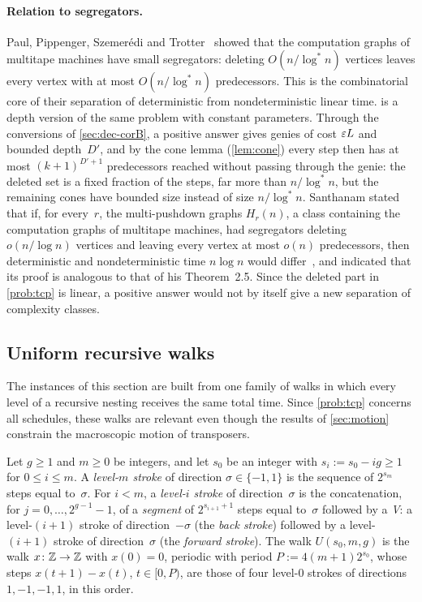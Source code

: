 \paragraph{Relation to segregators.} Paul, Pippenger, Szemer\'edi and Trotter~\cite{PPST1983} showed that the
computation graphs of multitape machines have small segregators: deleting $O(n/\log^*n)$ vertices leaves every vertex
with at most $O(n/\log^*n)$ predecessors. This is the combinatorial core of their separation of deterministic from
nondeterministic linear time.  is a depth version of the same problem with constant parameters.
Through the conversions of \cref{sec:dec-corB}, a positive answer gives genies of cost $\varepsilon L$ and bounded
depth~$D'$, and by the cone lemma (\cref{lem:cone}) every step then has at most $(k+1)^{D'+1}$ predecessors reached
without passing through the genie: the deleted set is a fixed fraction of the steps, far more than $n/\log^*n$, but
the remaining cones have bounded size instead of size $n/\log^*n$. Santhanam stated that if, for every~$r$, the
multi-pushdown graphs $H_r(n)$, a class containing the computation graphs of multitape machines, had segregators
deleting $o(n/\log n)$ vertices and leaving every vertex at most $o(n)$ predecessors, then deterministic and
nondeterministic time $n\log n$ would differ~\cite[Thm.~2.7]{Santhanam2001}, and indicated that its proof is analogous
to that of his Theorem~2.5. Since the deleted
part in \cref{prob:tcp} is linear, a positive answer would not by itself give a new separation of complexity classes.

\subsection{Uniform recursive walks}\label{sec:dep-walks}

The instances of this section are built from one family of walks in which every level of a recursive nesting
receives the same total time. Since \cref{prob:tcp} concerns all schedules, these walks are relevant even though the
results of \cref{sec:motion} constrain the macroscopic motion of transposers.

\begin{definition}\label{def:dep-walk}
Let $g\ge1$ and $m\ge0$ be integers, and let $s_0$ be an integer with $s_i:=s_0-ig\ge1$ for $0\le i\le m$. A
\emph{level-$m$ stroke} of direction $\sigma\in\{-1,1\}$ is the sequence of $2^{s_m}$ steps equal to~$\sigma$. For
$i<m$, a \emph{level-$i$ stroke} of direction~$\sigma$ is the concatenation, for $j=0,\dots,2^{g-1}-1$, of a
\emph{segment} of $2^{s_{i+1}+1}$ steps equal to~$\sigma$ followed by a \emph{V}: a level-$(i+1)$ stroke of
direction~$-\sigma$ (the \emph{back stroke}) followed by a level-$(i+1)$ stroke of direction~$\sigma$ (the
\emph{forward stroke}). The walk $U(s_0,m,g)$ is the walk $x\colon\mathbb{Z}\to\mathbb{Z}$ with $x(0)=0$, periodic with period
$P:=4(m+1)2^{s_0}$, whose steps $x(t+1)-x(t)$, $t\in[0,P)$, are those of four level-$0$ strokes of directions
$1,-1,-1,1$, in this order.
\end{definition}

